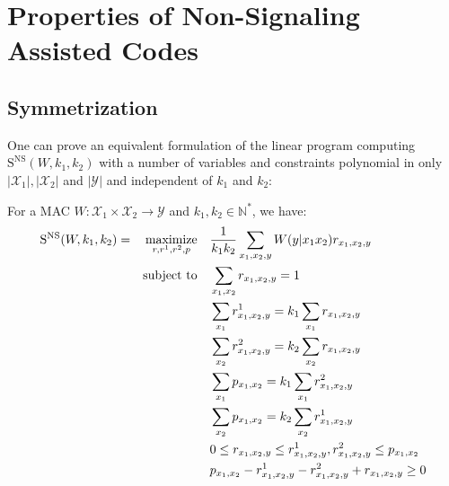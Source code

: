 \section{Properties of Non-Signaling Assisted Codes}
\label{section:complexity}
\subsection{Symmetrization}
One can prove an equivalent formulation of the linear program computing $\mathrm{S}^{\mathrm{NS}}(W,k_1,k_2)$ with a number of variables and constraints polynomial in only $|\mathcal{X}_1|,|\mathcal{X}_2|$ and $|\mathcal{Y}|$ and independent of $k_1$ and $k_2$:
\begin{proposition}
  \label{prop:NSLP}
  For a MAC $W: \mathcal{X}_1 \times \mathcal{X}_2 \rightarrow \mathcal{Y}$ and $k_1,k_2 \in \mathbb{N}^*$, we have:
  \begin{equation}
  \begin{aligned}
    \mathrm{S}^{\mathrm{NS}}(W,k_1,k_2) = &&\underset{r,r^1,r^2,p}{\operatorname{\text{maximize}}} &&& \frac{1}{k_1k_2} \sum_{x_1,x_2,y} W(y|x_1x_2)r_{x_1,x_2,y}\\
    &&\operatorname{\text{subject to}} &&& \sum_{x_1,x_2} r_{x_1,x_2,y} = 1\\
    &&&&& \sum_{x_1} r^1_{x_1,x_2,y} = k_1 \sum_{x_1} r_{x_1,x_2,y}\\
    &&&&& \sum_{x_2} r^2_{x_1,x_2,y} = k_2 \sum_{x_2} r_{x_1,x_2,y}\\
    &&&&& \sum_{x_1} p_{x_1,x_2} = k_1 \sum_{x_1} r^2_{x_1,x_2,y}\\
    &&&&& \sum_{x_2} p_{x_1,x_2} = k_2 \sum_{x_2} r^1_{x_1,x_2,y}\\
    &&&&& 0 \leq r_{x_1,x_2,y} \leq r^1_{x_1,x_2,y},r^2_{x_1,x_2,y} \leq p_{x_1,x_2}\\
    &&&&& p_{x_1,x_2} -  r^1_{x_1,x_2,y} - r^2_{x_1,x_2,y} + r_{x_1,x_2,y} \geq 0
  \end{aligned}
  \end{equation}

\end{proposition}

